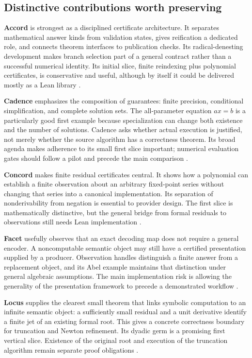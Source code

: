 \documentclass[11pt,letterpaper]{article}
\begin{document}
\subsection{Distinctive contributions worth preserving}
\textbf{Accord} is strongest as a disciplined certificate architecture. It
separates mathematical answer kinds from validation states, gives reification a
dedicated role, and connects theorem interfaces to publication checks. Its
radical-denesting development makes branch selection part of a general
contract rather than a successful numerical identity. Its initial slice,
finite reindexing plus polynomial certificates, is conservative and useful,
although by itself it could be delivered mostly as a Lean library
\cite[\S\S5--8,12--17]{accord}.

\textbf{Cadence} emphasizes the composition of guarantees: finite precision,
conditional simplification, and complete solution sets. The all-parameter
equation \(ax=b\) is a particularly good first example because specialization
can change both existence and the number of solutions. Cadence asks whether
actual execution is justified, not merely whether the source algorithm has a
correctness theorem. Its broad agenda makes adherence to its small first slice
important; numerical evaluation gates should follow a pilot and precede the main comparison
\cite[\S\S4--7,9--10,15--18]{cadence}.

\textbf{Concord} makes finite residual certificates central. It shows how a
polynomial can establish a finite observation about an arbitrary fixed-point
series without changing that series into a canonical implementation. Its
separation of nonderivability from negation is essential to provider design.
The first slice is mathematically distinctive, but the general bridge from
formal residuals to observations still needs Lean implementation
\cite[\S\S4--7,10,13,15,17]{concord}.

\textbf{Facet} usefully observes that an exact decoding map does not require a
general encoder. A noncomputable semantic object may still have a certified
presentation supplied by a producer. Observation handles distinguish a finite
answer from a replacement object, and its Abel example maintains that distinction
under general algebraic assumptions. The main implementation risk is allowing
the generality of the presentation framework to precede a demonstrated workflow
\cite[\S\S4--6,9,11--15]{facet}.

\textbf{Locus} supplies the clearest small theorem that links symbolic computation
to an infinite semantic object: a sufficiently small residual and a unit
derivative identify a finite jet of an existing formal root. This gives a
concrete correctness boundary for truncation and Newton refinement. Its dyadic
germ is a promising first vertical slice. Existence of the original root and
execution of the truncation algorithm remain separate proof obligations
\cite[\S\S4--8,12--14]{locus}.
\end{document}
